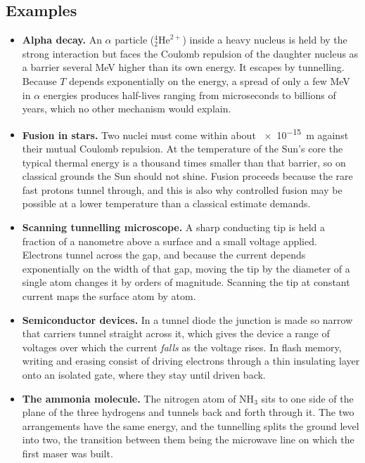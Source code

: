     \subsection{Examples}

        \begin{itemize}
            \item \textbf{Alpha decay.} An $\alpha$ particle (${}^{4}_2\text{He}^{2+}$) inside a heavy nucleus is held by the strong interaction but faces the Coulomb repulsion of the daughter nucleus as a barrier several MeV higher than its own energy. It escapes by tunnelling. Because $T$ depends exponentially on the energy, a spread of only a few MeV in $\alpha$ energies produces half-lives ranging from microseconds to billions of years, which no other mechanism would explain.
            \item \textbf{Fusion in stars.} Two nuclei must come within about \qty{e-15}{\metre} against their mutual Coulomb repulsion. At the temperature of the Sun's core the typical thermal energy is a thousand times smaller than that barrier, so on classical grounds the Sun should not shine. Fusion proceeds because the rare fast protons tunnel through, and this is also why controlled fusion may be possible at a lower temperature than a classical estimate demands.
            \item \textbf{Scanning tunnelling microscope.} A sharp conducting tip is held a fraction of a nanometre above a surface and a small voltage applied. Electrons tunnel across the gap, and because the current depends exponentially on the width of that gap, moving the tip by the diameter of a single atom changes it by orders of magnitude. Scanning the tip at constant current maps the surface atom by atom.
            \item \textbf{Semiconductor devices.} In a tunnel diode the junction is made so narrow that carriers tunnel straight across it, which gives the device a range of voltages over which the current \emph{falls} as the voltage rises. In flash memory, writing and erasing consist of driving electrons through a thin insulating layer onto an isolated gate, where they stay until driven back.
            \item \textbf{The ammonia molecule.} The nitrogen atom of NH$_3$ sits to one side of the plane of the three hydrogens and tunnels back and forth through it. The two arrangements have the same energy, and the tunnelling splits the ground level into two, the transition between them being the microwave line on which the first maser was built.
        \end{itemize}